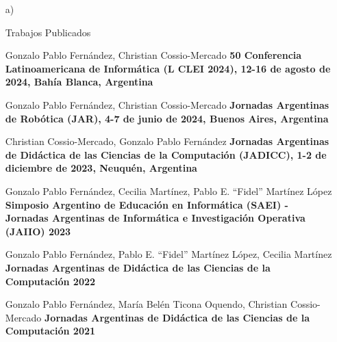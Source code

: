 \begin{enumerate}[leftmargin=0.8cm]

  \item[a)]{Trabajos Publicados
    \begin{itemize}[leftmargin=0.2cm]

      {Gonzalo Pablo Fernández, Christian Cossio-Mercado}
      {\textbf{50 Conferencia Latinoamericana de Informática (L CLEI 2024), 12-16 de agosto de 2024, Bahía
      Blanca, Argentina}}

      {Gonzalo Pablo Fernández, Christian Cossio-Mercado}
      {\textbf{Jornadas Argentinas de Robótica (JAR), 4-7 de junio de 2024, Buenos Aires, Argentina}}

      {Christian Cossio-Mercado, Gonzalo Pablo Fernández}
      {\textbf{Jornadas Argentinas de Didáctica de las Ciencias de la Computación (JADICC), 1-2 de diciembre de 2023, Neuquén, Argentina}}

      {Gonzalo Pablo Fernández, Cecilia Martínez, Pablo E. ``Fidel'' Martínez López}
      {\textbf{Simposio Argentino de Educación en Informática (SAEI) - Jornadas Argentinas de Informática e Investigación Operativa (JAIIO) 2023}}

      {Gonzalo Pablo Fernández, Pablo E. ``Fidel'' Martínez López, Cecilia Martínez}
      {\textbf{Jornadas Argentinas de Didáctica de las Ciencias de la Computación 2022}}

      {Gonzalo Pablo Fernández, María Belén Ticona Oquendo, Christian Cossio-Mercado}
      {\textbf{Jornadas Argentinas de Didáctica de las Ciencias de la Computación 2021}}


\end{itemize}}
\end{enumerate}
